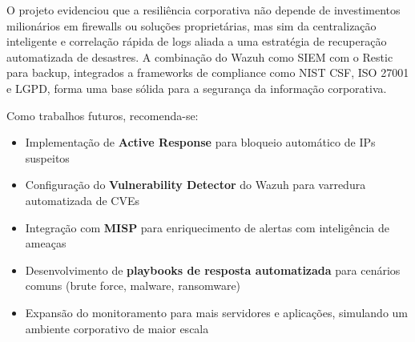 \documentclass[12pt,a4paper]{article}
\begin{document}
    O projeto evidenciou que a resiliência corporativa não depende de investimentos milionários em firewalls ou soluções proprietárias, mas sim da centralização inteligente e correlação rápida de logs aliada a uma estratégia de recuperação automatizada de desastres. A combinação do Wazuh como SIEM com o Restic para backup, integrados a frameworks de compliance como NIST CSF, ISO 27001 e LGPD, forma uma base sólida para a segurança da informação corporativa.

    Como trabalhos futuros, recomenda-se:
    \begin{itemize}
        \item Implementação de \textbf{Active Response} para bloqueio automático de IPs suspeitos
        \item Configuração do \textbf{Vulnerability Detector} do Wazuh para varredura automatizada de CVEs
        \item Integração com \textbf{MISP} para enriquecimento de alertas com inteligência de ameaças
        \item Desenvolvimento de \textbf{playbooks de resposta automatizada} para cenários comuns (brute force, malware, ransomware)
        \item Expansão do monitoramento para mais servidores e aplicações, simulando um ambiente corporativo de maior escala
    \end{itemize}

    \newpage
\end{document}
